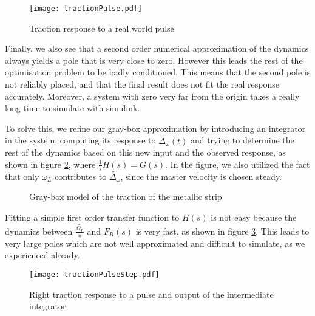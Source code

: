 \begin{figure}[htbp]
\centering
\texttt{[image: tractionPulse.pdf]}
\caption{Traction response to a real world pulse\label{fig:tracImpulseResponse}}
\end{figure}

Finally, we also see that a second order numerical approximation of the dynamics always yields a pole that is very close to zero. However this leads the rest of the optimisation problem to be badly conditioned. This means that the second pole is not reliably placed, and that the final result does not fit the real response accurately. Moreover, a system with zero very far from the origin takes a really long time to simulate with simulink.

To solve this, we refine our gray-box approximation by introducing an integrator in the system, computing its response to $\tilde{\Delta_\omega}(t)$ and trying to determine the rest of the dynamics based on this new input and the observed response, as shown in figure \ref{fig:tractionGrayBox}, where $\frac{1}{s}H(s) = G(s)$. In the figure, we also utilized the fact that only $\omega_L$ contributes to $\tilde{\Delta_\omega}$, since the master velocity is chosen steady.
\begin{figure}[htbp]
\centering
{}
\caption{\label{fig:tractionInput}Gray-box model of the traction of the metallic strip\label{fig:tractionGrayBox}}
\end{figure}

Fitting a simple first order transfer function to $H(s)$ is not easy because the dynamics between $\frac{\tilde{\Omega_L}}{s}$ and $F_R(s)$ is very fast, as shown in figure \ref{fig:tractionPulseStep}. This leads to very large poles which are not well approximated and difficult to simulate, as we experienced already.
\begin{figure}[htbp]
\centering
\texttt{[image: tractionPulseStep.pdf]}
\caption{Right traction response to a pulse and output of the intermediate integrator\label{fig:tractionPulseStep}}
\end{figure}

